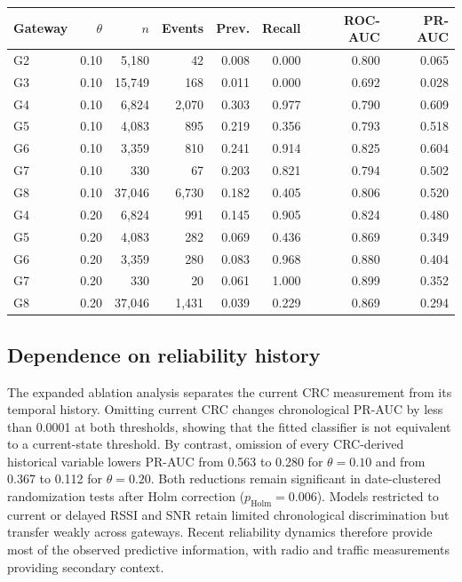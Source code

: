 \documentclass{jot}
\begin{document}
\begin{table}[t]
\centering
\begin{tabular}{@{}lrrrrrrr@{}}
\toprule
Gateway & $\theta$ & $n$ & Events & Prev. & Recall & ROC-AUC & PR-AUC \\
\midrule
G2 & 0.10 & 5,180 & 42 & 0.008 & 0.000 & 0.800 & 0.065 \\
G3 & 0.10 & 15,749 & 168 & 0.011 & 0.000 & 0.692 & 0.028 \\
G4 & 0.10 & 6,824 & 2,070 & 0.303 & 0.977 & 0.790 & 0.609 \\
G5 & 0.10 & 4,083 & 895 & 0.219 & 0.356 & 0.793 & 0.518 \\
G6 & 0.10 & 3,359 & 810 & 0.241 & 0.914 & 0.825 & 0.604 \\
G7 & 0.10 & 330 & 67 & 0.203 & 0.821 & 0.794 & 0.502 \\
G8 & 0.10 & 37,046 & 6,730 & 0.182 & 0.405 & 0.806 & 0.520 \\
G4 & 0.20 & 6,824 & 991 & 0.145 & 0.905 & 0.824 & 0.480 \\
G5 & 0.20 & 4,083 & 282 & 0.069 & 0.436 & 0.869 & 0.349 \\
G6 & 0.20 & 3,359 & 280 & 0.083 & 0.968 & 0.880 & 0.404 \\
G7 & 0.20 & 330 & 20 & 0.061 & 1.000 & 0.899 & 0.352 \\
G8 & 0.20 & 37,046 & 1,431 & 0.039 & 0.229 & 0.869 & 0.294 \\
\bottomrule
\end{tabular}
\end{table}

\subsection{Dependence on reliability history}\label{s:4.7}

The expanded ablation analysis separates the current CRC measurement from its temporal history. Omitting current CRC changes chronological PR-AUC by less than 0.0001 at both thresholds, showing that the fitted classifier is not equivalent to a current-state threshold. By contrast, omission of every CRC-derived historical variable lowers PR-AUC from 0.563 to 0.280 for $\theta=0.10$ and from 0.367 to 0.112 for $\theta=0.20$. Both reductions remain significant in date-clustered randomization tests after Holm correction ($p_{\mathrm{Holm}}=0.006$). Models restricted to current or delayed RSSI and SNR retain limited chronological discrimination but transfer weakly across gateways. Recent reliability dynamics therefore provide most of the observed predictive information, with radio and traffic measurements providing secondary context.
\end{document}
